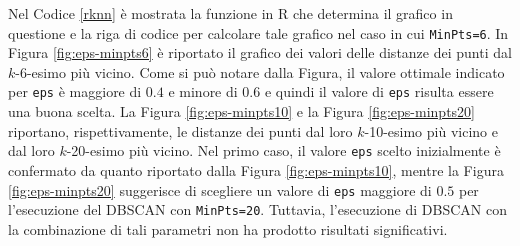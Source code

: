 \documentclass[12pt]{article}
\begin{document}
Nel Codice \ref{rknn} è mostrata la funzione in R che determina il grafico in questione e la riga di codice per calcolare tale grafico nel caso in cui \texttt{MinPts=6}. 
In Figura \ref{fig:eps-minpts6} è riportato il grafico dei valori delle distanze dei punti dal $k$-6-esimo più vicino. 
Come si può notare dalla Figura, il valore ottimale indicato per \texttt{eps} è maggiore di $0.4$ e minore di $0.6$ e quindi il valore di \texttt{eps} risulta essere una buona scelta. 
La Figura \ref{fig:eps-minpts10} e la Figura \ref{fig:eps-minpts20} riportano, rispettivamente, le distanze dei punti dal loro $k$-10-esimo più vicino e dal loro $k$-20-esimo più vicino. 
Nel primo caso, il valore \texttt{eps} scelto inizialmen\-te è confermato da quanto riportato dalla Figura \ref{fig:eps-minpts10}, mentre la Figura \ref{fig:eps-minpts20} suggerisce di scegliere un valore di \texttt{eps} maggiore di $0.5$ per l'esecuzione del DBSCAN con \texttt{MinPts=20}. 
Tuttavia, l'esecuzione di DBSCAN con la combinazione di tali parametri non ha prodotto risultati significativi.
\end{document}
